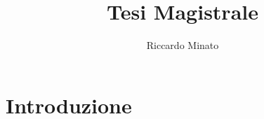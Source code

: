 \documentclass{article}
\title{Tesi Magistrale}
\author{Riccardo Minato}
\date{}
\begin{document}
\maketitle
\tableofcontents
\printglossary




\section{Introduzione}




\end{document}
